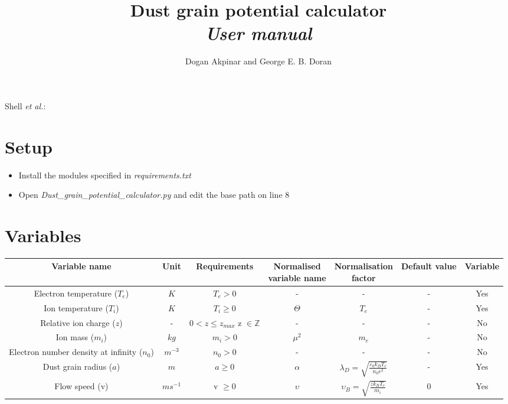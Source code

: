\documentclass{journal}
\begin{document}
\title{Dust grain potential calculator \\ \it{User manual}}
\author{Dogan Akpinar and George E. B. Doran}
{Shell \MakeLowercase{\textit{et al.}}:}

\maketitle

\section{Setup}

\begin{itemize}
    \item Install the modules specified in \textit{requirements.txt}
    \item Open \textit{Dust\_grain\_potential\_calculator.py} and edit the base path on line 8
\end{itemize}

\section{Variables}

\begin{table}[H]
    \begin{adjustwidth}{-2.5cm}{}
        \label{tab:ValueTable}
        \begin{tabular}{|c|c|c|c|c|c|c|} 
        \hline
        Variable name & Unit & Requirements & \makecell{Normalised \\ variable name} & \makecell{Normalisation \\ factor} & Default value & Variable\\
        \hline
        Electron temperature ($T_e$) & $K$ & $T_e > 0$ & - & - & - & Yes \\
        \hline
        Ion temperature ($T_i$) & $K$ & $T_i \geq 0$ & $\Theta$ & $T_e$ & - & Yes \\
        \hline
        Relative ion charge ($z$) & - & \makecell{$0 < z \leq z_{max}$ \\ z $\in \mathds{Z}$} & - & - & - & No \\
        \hline
        Ion mass ($m_i$) & $kg$ & $m_i > 0$ & $\mu^2$ & $m_e$ & - & No \\
        \hline
        \makecell{Electron number density \\ at infinity ($n_0$)} & $m^{-3}$ & $n_0>0$ & - & - & - & No\\
        \hline
        Dust grain radius ($a$) & $m$ & $a \geq 0$ & $\alpha$ & $\lambda_D = \sqrt{\frac{\varepsilon_0 k_B T_e}{n_0 e^2}}$ & - & Yes\\
        \hline
        Flow speed (v) & $ms^{-1}$ & v $\geq 0$ & $\upsilon$ & $\upsilon_B = \sqrt{\frac{z k_B T_e}{m_i}}$ & 0 & Yes \\
        \hline
        \end{tabular}
    \end{adjustwidth}
\end{table}
\end{document}
